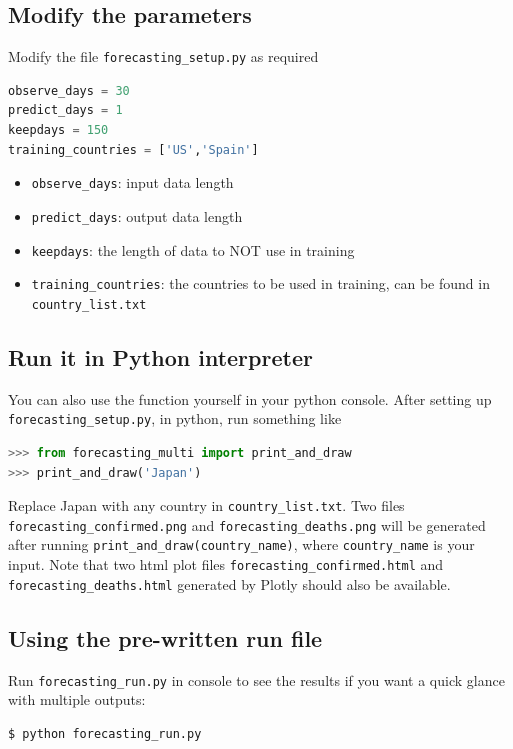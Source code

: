 \documentclass[a4paper,12pt]{article}
\begin{document}
\subsection{Modify the parameters}
Modify the file \texttt{forecasting\_setup.py} as required
\begin{lstlisting}[language=Python]
observe_days = 30
predict_days = 1
keepdays = 150
training_countries = ['US','Spain']
\end{lstlisting}
\begin{itemize}
    \item \texttt{observe\_days}: input data length
    \item \texttt{predict\_days}: output data length
    \item \texttt{keepdays}: the length of data to NOT use in training
    \item \texttt{training\_countries}: the countries to be used in training, can be found in \texttt{country\_list.txt}
\end{itemize}

\subsection{Run it in Python interpreter}
You can also use the function yourself in your python console. After setting up \texttt{forecasting\_setup.py}, in python, run something like
\begin{lstlisting}[language=Python]
>>> from forecasting_multi import print_and_draw
>>> print_and_draw('Japan') 
\end{lstlisting}
Replace Japan with any country in \texttt{country\_list.txt}. Two files \\
\texttt{forecasting\_confirmed.png} and \texttt{forecasting\_deaths.png} will be generated after running \texttt{print\_and\_draw(country\_name)}, where \texttt{country\_name} is your input. Note that two html plot files \texttt{forecasting\_confirmed.html} and \texttt{forecasting\_deaths.html} generated by Plotly should also be available.

\subsection{Using the pre-written run file}
Run \texttt{forecasting\_run.py} in console to see the results if you want a quick glance with multiple outputs:
\begin{lstlisting}[language=bash]
$ python forecasting_run.py
\end{lstlisting}
\end{document}
